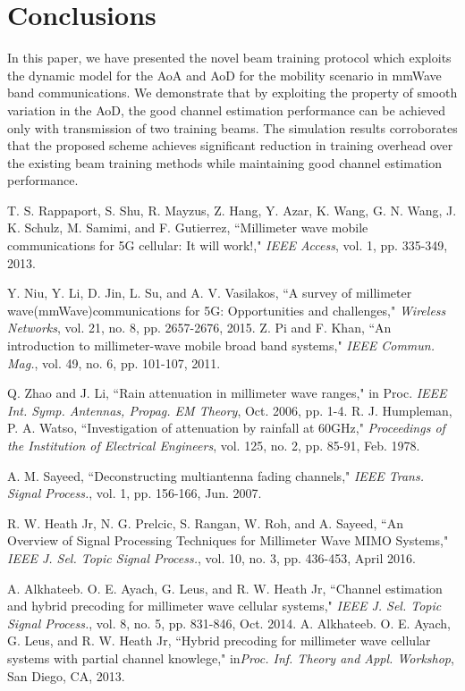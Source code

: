\documentclass[conference]{IEEEtran}
\begin{document}
\section{Conclusions} \label{sec_conclusion}

In this paper, we have presented the novel beam training protocol which exploits the dynamic model for the AoA and AoD for the mobility scenario in mmWave band communications.
We demonstrate that by exploiting the property of smooth variation in the AoD, the good channel estimation performance can be achieved only with transmission of two training beams.
The simulation results corroborates that the proposed scheme achieves significant reduction in training overhead over the existing beam training methods while maintaining
good channel estimation performance.

\begin{thebibliography}{1}
T. S. Rappaport, S. Shu, R. Mayzus, Z. Hang, Y. Azar, K. Wang, G. N. Wang, J. K. Schulz, M. Samimi, and F. Gutierrez, ``Millimeter wave mobile communications for 5G cellular: It will work!," {\it IEEE Access}, vol. 1, pp. 335-349, 2013.

Y. Niu, Y. Li, D. Jin, L. Su, and A. V. Vasilakos, ``A survey of millimeter wave(mmWave)communications for 5G: Opportunities and challenges," {\it Wireless Networks}, vol. 21, no. 8, pp. 2657-2676, 2015.
Z. Pi and F. Khan, ``An introduction to millimeter-wave mobile broad band systems," {\it IEEE Commun. Mag.}, vol. 49, no. 6, pp. 101-107, 2011.

Q. Zhao and J. Li, ``Rain attenuation in millimeter wave ranges," in Proc. {\it IEEE Int. Symp. Antennas, Propag. EM Theory}, Oct. 2006, pp. 1-4.
R. J. Humpleman, P. A. Watso, ``Investigation of attenuation by rainfall at 60GHz," {\it Proceedings of the Institution of Electrical Engineers}, vol. 125, no. 2, pp. 85-91, Feb. 1978.

A. M. Sayeed, ``Deconstructing multiantenna fading channels," {\it IEEE Trans. Signal Process.}, vol. 1, pp. 156-166, Jun. 2007.

R. W. Heath Jr, N. G. Prelcic, S. Rangan, W. Roh, and A. Sayeed, ``An Overview of Signal Processing Techniques for Millimeter Wave MIMO Systems," {\it IEEE J. Sel. Topic Signal Process.}, vol. 10, no. 3, pp. 436-453, April 2016.

A. Alkhateeb. O. E. Ayach, G. Leus, and R. W. Heath Jr, ``Channel estimation and hybrid precoding for millimeter wave cellular systems," {\it IEEE J. Sel. Topic Signal Process.}, vol. 8, no. 5, pp. 831-846, Oct. 2014.
A. Alkhateeb. O. E. Ayach, G. Leus, and R. W. Heath Jr, ``Hybrid precoding for millimeter wave cellular systems with partial channel knowlege," in{\it Proc. Inf. Theory and Appl. Workshop}, San Diego, CA, 2013.


\end{thebibliography}
\end{document}
